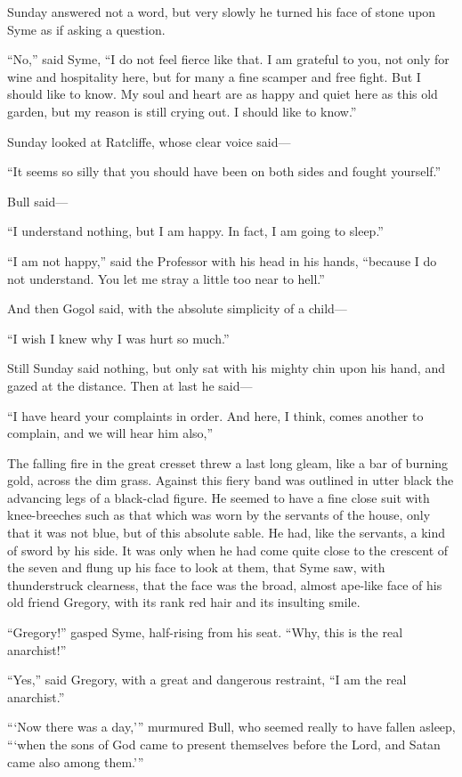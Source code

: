 \documentclass{book}
\begin{document}
Sunday answered not a word, but very slowly he turned his face of stone upon Syme as if asking a question.

“No,” said Syme, “I do not feel fierce like that. I am grateful to you, not only for wine and hospitality here, but for many a fine scamper and free fight. But I should like to know. My soul and heart are as happy and quiet here as this old garden, but my reason is still crying out. I should like to know.”

Sunday looked at Ratcliffe, whose clear voice said—

“It seems so silly that you should have been on both sides and fought yourself.”

Bull said—

“I understand nothing, but I am happy. In fact, I am going to sleep.”

“I am not happy,” said the Professor with his head in his hands, “because I do not understand. You let me stray a little too near to hell.”

And then Gogol said, with the absolute simplicity of a child—

“I wish I knew why I was hurt so much.”

Still Sunday said nothing, but only sat with his mighty chin upon his hand, and gazed at the distance. Then at last he said—

“I have heard your complaints in order. And here, I think, comes another to complain, and we will hear him also,”

The falling fire in the great cresset threw a last long gleam, like a bar of burning gold, across the dim grass. Against this fiery band was outlined in utter black the advancing legs of a black-clad figure. He seemed to have a fine close suit with knee-breeches such as that which was worn by the servants of the house, only that it was not blue, but of this absolute sable. He had, like the servants, a kind of sword by his side. It was only when he had come quite close to the crescent of the seven and flung up his face to look at them, that Syme saw, with thunderstruck clearness, that the face was the broad, almost ape-like face of his old friend Gregory, with its rank red hair and its insulting smile.

“Gregory!” gasped Syme, half-rising from his seat. “Why, this is the real anarchist!”

“Yes,” said Gregory, with a great and dangerous restraint, “I am the real anarchist.”

“‘Now there was a day,’” murmured Bull, who seemed really to have fallen asleep, “‘when the sons of God came to present themselves before the Lord, and Satan came also among them.’”
\end{document}
